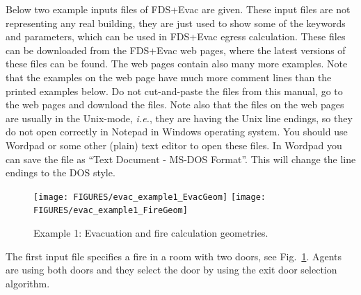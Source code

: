 \documentclass[12pt,a4paper,final,twoside]{stylevk}
\begin{document}
\noindent Below two example inputs files of FDS+Evac are given.  These
input files are not representing any real building, they are just used
to show some of the keywords and parameters, which can be used in
FDS+Evac egress calculation.  These files can be downloaded from the
FDS+Evac web pages, where the latest versions of these files can be
found.  The web pages contain also many more examples.  Note that the
examples on the web page have much more comment lines than the printed
examples below.  Do not cut-and-paste the files from this manual, go
to the web pages and download the files.  Note also that the files on
the web pages are usually in the Unix-mode, \emph{i.e.}, they are
having the Unix line endings, so they do not open correctly in Notepad
in Windows operating system.  You should use Wordpad or some other
(plain) text editor to open these files.  In Wordpad you can save the
file as ``Text Document - MS-DOS Format''.  This will change the line
endings to the DOS style.


\begin{figure}[!b]
  \centerline{\texttt{[image: FIGURES/evac\_example1\_EvacGeom]} \texttt{[image: FIGURES/evac\_example1\_FireGeom]}}
  \caption{Example 1: Evacuation and fire calculation
    geometries.}\label{Fig_Ex1EvacGeom}
\end{figure}


The first input file specifies a fire in a room with two doors, see
Fig.~\ref{Fig_Ex1EvacGeom}.  Agents are using both doors and they
select the door by using the exit door selection algorithm.
\vspace{\fill}
\end{document}
